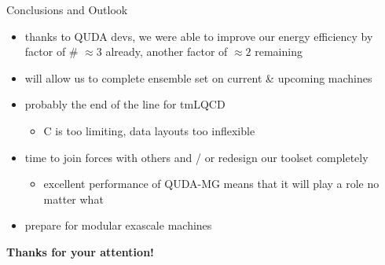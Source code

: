 \documentclass[xcolor={dvipsnames,table}]{beamer}
\begin{document}
{%
}

\begin{frame}{Conclusions and Outlook}
  \begin{itemize}
    \item thanks to QUDA devs, we were able to improve our energy efficiency by factor of \# $\approx 3$ already, another factor of $\approx2$ remaining  
    \vspace{0.2cm}
    \item will allow us to complete ensemble set on current \& upcoming machines
    \vspace{0.2cm}
    \item probably the end of the line for tmLQCD
    \begin{itemize}
      \item C is too limiting, data layouts too inflexible 
    \end{itemize}
    \vspace{0.2cm}
    \item time to join forces with others and / or redesign our toolset completely
    \begin{itemize}
      \item excellent performance of QUDA-MG means that it will play a role no matter what
    \end{itemize}
    \vspace{0.2cm}
    \item prepare for modular exascale machines
  \end{itemize}
  \centering
  \vspace{1.0cm}
  \textbf{Thanks for your attention!}

\end{frame}
\end{document}
